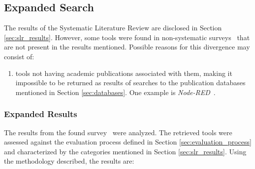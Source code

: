 \subsection{Expanded Search}\label{sec:slr_expanded_research}

The results of the Systematic Literature Review are disclosed in Section \ref{sec:slr_results}. However, some tools were found in non-systematic surveys~\cite{survey_vpl_iot} that are not present in the results mentioned. Possible reasons for this divergence may consist of:
\begin{enumerate}
    \item tools not having academic publications associated with them, making it impossible to be returned as results of searches to the publication databases mentioned in Section \ref{sec:databases}. One example is \textit{Node-RED}~\cite{node_red}.
\end{enumerate}

\subsubsection{Expanded Results}

The results from the found survey~\cite{survey_vpl_iot} were analyzed. The retrieved tools were assessed against the evaluation process defined in Section \ref{sec:evaluation_process} and characterized by the categories mentioned in Section \ref{sec:slr_results}. Using the methodology described, the results are:

